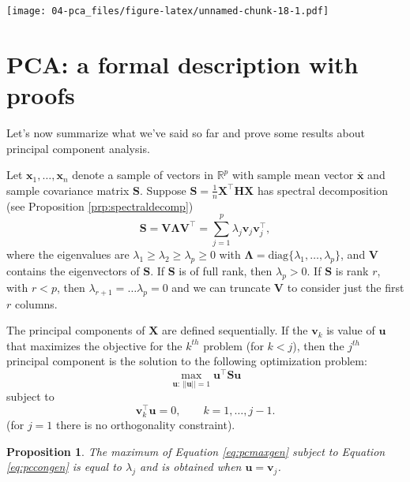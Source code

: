 \documentclass[
]{book}
\newtheorem{proposition}{Proposition}[chapter]
\theoremstyle{definition}
\theoremstyle{definition}
\theoremstyle{definition}
\theoremstyle{definition}
\theoremstyle{remark}
\begin{document}
\texttt{[image: 04-pca\_files/figure-latex/unnamed-chunk-18-1.pdf]}

\hypertarget{pca-a-formal-description-with-proofs}{%
\section{PCA: a formal description with proofs}\label{pca-a-formal-description-with-proofs}}

Let's now summarize what we've said so far and prove some results about principal component analysis.

Let \(\mathbf x_1, \ldots , \mathbf x_n\) denote a sample of vectors in \(\mathbb{R}^p\) with sample mean vector \(\bar{\mathbf x}\) and sample covariance matrix \(\mathbf S\). Suppose \(\mathbf S=\frac{1}{n}\mathbf X^\top \mathbf H\mathbf X\) has spectral decomposition (see Proposition \ref{prp:spectraldecomp})
\begin{equation}
\mathbf S=\mathbf V\boldsymbol \Lambda\mathbf V^\top = \sum_{j=1}^p  \lambda_j \mathbf v_j \mathbf v_j^\top,
\label{eq:pcaspect}
\end{equation}
where the eigenvalues are \(\lambda_1 \geq \lambda_2 \geq \lambda_p \geq 0\) with \(\boldsymbol \Lambda=\text{diag}\{\lambda_1, \ldots, \lambda_p\}\), and \(\mathbf V\) contains the eigenvectors of \(\mathbf S\). If \(\mathbf S\) is of full rank, then \(\lambda_p>0\). If \(\mathbf S\) is rank \(r\), with \(r<p\), then \(\lambda_{r+1}=\ldots \lambda_p=0\) and we can truncate \(\mathbf V\) to consider just the first \(r\) columns.

The principal components of \(\mathbf X\) are defined sequentially. If the \(\mathbf v_k\) is value of \(\mathbf u\) that maximizes the objective for the \(k^{th}\) problem (for \(k<j\)), then the \(j^{th}\) principal component is the solution to the following optimization problem:
\begin{equation}
\max_{\mathbf u: \, \vert \vert \mathbf u\vert \vert =1}\mathbf u^\top \mathbf S\mathbf u
\label{eq:pcmaxgen}
\end{equation}
subject to
\begin{equation}
\mathbf v_k^\top \mathbf u=0, \qquad k=1, \ldots , j-1.
\label{eq:pccongen}
\end{equation}
(for \(j=1\) there is no orthogonality constraint).

\begin{proposition}
\protect\hypertarget{prp:pca1}{}\label{prp:pca1}The maximum of Equation \eqref{eq:pcmaxgen}
subject to Equation \eqref{eq:pccongen} is equal to \(\lambda_j\) and is obtained when \(\mathbf u=\mathbf v_j\).
\end{proposition}
\end{document}
